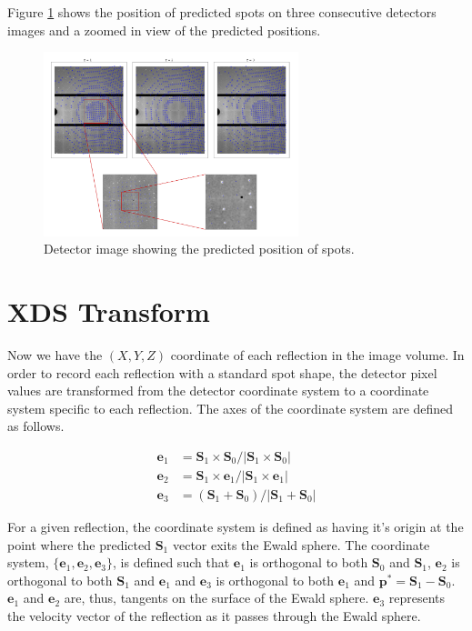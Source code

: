 \documentclass[a4paper,10pt]{article}
\begin{document}
Figure \ref{figure: spot prediction} shows the position of predicted spots on
three consecutive detectors images and a zoomed in view of the predicted 
positions.

\begin{figure}
  \centering
  \includegraphics[width=0.66\textwidth]{./Figures/spot_prediction.png}
  \caption{Detector image showing the predicted position of spots.}
  \label{figure: spot prediction}
\end{figure}

\section{XDS Transform}

Now we have the $(X, Y, Z)$ coordinate of each reflection in the image volume.
In order to record each reflection with a standard spot shape, the detector
pixel values are transformed from the detector coordinate system to a coordinate
system specific to each reflection. The axes of the coordinate system are
defined as follows.

\begin{equation}
  \begin{aligned}
    \bm{e}_1 &= \bm{S}_1 \times \bm{S}_0 / |\bm{S}_1 \times \bm{S}_0| \\
    \bm{e}_2 &= \bm{S}_1 \times \bm{e}_1 / |\bm{S}_1 \times \bm{e}_1| \\
    \bm{e}_3 &= (\bm{S}_1 + \bm{S}_0)    / |\bm{S}_1 + \bm{S}_0|
  \end{aligned}
\end{equation}

For a given reflection, the coordinate system is defined as having it's origin 
at the point where the predicted $\bm{S}_1$ vector exits the Ewald sphere. The
coordinate system, $\{\bm{e}_1, \bm{e}_2, \bm{e}_3\}$, is defined such that
$\bm{e}_1$ is orthogonal to both $\bm{S}_0$ and $\bm{S}_1$, $\bm{e}_2$ is 
orthogonal to both $\bm{S}_1$ and $\bm{e}_1$ and $\bm{e}_3$ is orthogonal to
both $\bm{e}_1$ and $\bm{p}^* = \bm{S}_1 - \bm{S}_0$. $\bm{e}_1$ and $\bm{e}_2$
are, thus, tangents on the surface of the Ewald sphere. $\bm{e}_3$ represents
the velocity vector of the reflection as it passes through the Ewald sphere.
\end{document}
